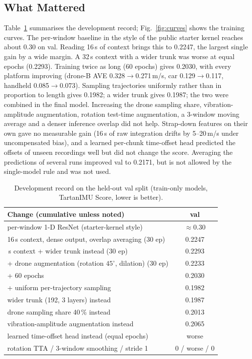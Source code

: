 \documentclass[letterpaper,10pt,conference]{ieeeconf}
\begin{document}
\subsection{What Mattered}
Table~\ref{tab:ablation} summarises the development record; Fig.~\ref{fig:curves} shows the training curves.
The per-window baseline in the style of the public starter kernel reaches about 0.30 on val. Reading 16\,s of context
brings this to 0.2247, the largest single gain by a wide margin. A 32\,s context with a wider trunk was worse at equal
epochs (0.2293). Training twice as long (60 epochs) gives 0.2030, with every platform improving (drone-B AVE
0.328$\to$0.271\,m/s, car 0.129$\to$0.117, handheld 0.085$\to$0.073). Sampling trajectories uniformly rather than in
proportion to length gives 0.1982; a wider trunk gives 0.1987; the two were combined in the final model. Increasing
the drone sampling share, vibration-amplitude augmentation, rotation test-time augmentation, a 3-window moving
average and a denser inference overlap did not help. Strap-down features on their own gave no measurable gain (16\,s
of raw integration drifts by 5--20\,m/s under uncompensated bias), and a learned per-chunk time-offset head predicted
the offsets of unseen recordings well but did not change the score. Averaging the predictions of several runs
improved val to 0.2171, but is not allowed by the single-model rule and was not used.

\begin{table}[t]
    \centering\footnotesize
    \caption{Development record on the held-out val split (train-only models, TartanIMU Score, lower is better).}
    \begin{tabular}{lc}
        \toprule Change (cumulative unless noted) & val \\ \midrule
        per-window 1-D ResNet (starter-kernel style) & $\approx$0.30 \\
        16\,s context, dense output, overlap averaging (30 ep) & 0.2247 \\
        \quad 32\,s context + wider trunk instead (30 ep) & 0.2293 \\
        + drone augmentation (rotation $45^\circ$, dilation) (30 ep) & 0.2233 \\
        + 60 epochs & 0.2030 \\
        + uniform per-trajectory sampling & 0.1982 \\
        \quad wider trunk (192, 3 layers) instead & 0.1987 \\
        \quad drone sampling share 40\,\% instead & 0.2013 \\
        \quad vibration-amplitude augmentation instead & 0.2065 \\
        \quad learned time-offset head instead (equal epochs) & worse \\
        \quad rotation TTA / 3-window smoothing / stride 1 & 0 / worse / 0 \\
        \bottomrule
    \end{tabular}
    \label{tab:ablation}
\end{table}
\end{document}
